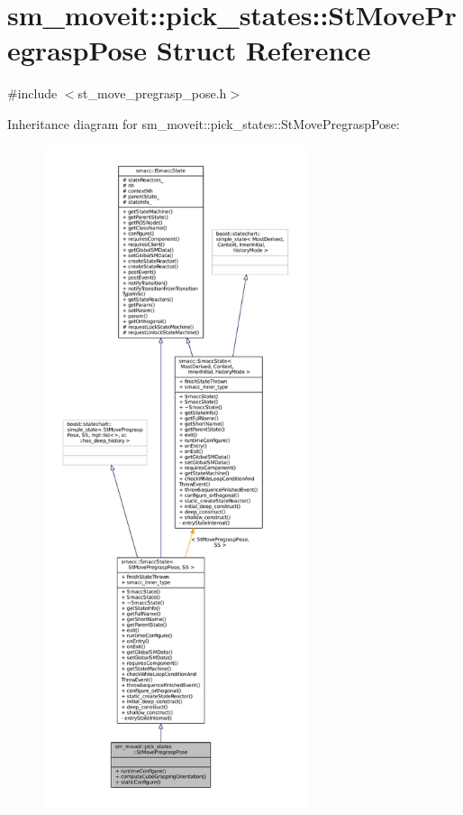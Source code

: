\hypertarget{structsm__moveit_1_1pick__states_1_1StMovePregraspPose}{}\section{sm\+\_\+moveit\+:\+:pick\+\_\+states\+:\+:St\+Move\+Pregrasp\+Pose Struct Reference}
\label{structsm__moveit_1_1pick__states_1_1StMovePregraspPose}


{\ttfamily \#include $<$st\+\_\+move\+\_\+pregrasp\+\_\+pose.\+h$>$}



Inheritance diagram for sm\+\_\+moveit\+:\+:pick\+\_\+states\+:\+:St\+Move\+Pregrasp\+Pose\+:
\nopagebreak
\begin{figure}[H]
\begin{center}
\leavevmode
\includegraphics[height=550pt]{structsm__moveit_1_1pick__states_1_1StMovePregraspPose__inherit__graph}
\end{center}
\end{figure}


